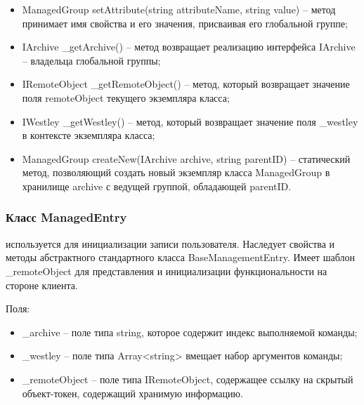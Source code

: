 \begin{itemize}
  \item ManagedGroup setAttribute(string attributeName, string value) – метод принимает имя свойства и его значения, присваивая его глобальной группе;
  \item IArchive \_getArchive() – метод возвращает реализацию интерфейса IArchive – владельца глобальной группы;
  \item IRemoteObject \_getRemoteObject() – метод, который возвращает значение поля remoteObject текущего экземпляра класса;
  \item IWestley \_getWestley() – метод, который возвращает значение поля \_westley в контексте экземпляра класса;
  \item ManagedGroup createNew(IArchive archive, string parentID) – статический метод, позволяющий создать новый экземпляр класса ManagedGroup в хранилище archive с ведущей группой, обладающей parentID.
\end{itemize}

\subsubsection{Класс ManagedEntry }
\label{sub:arch_and_mod:probab_net:managedentry}

используется для инициализации записи пользователя. Наследует свойства и методы абстрактного стандартного класса BaseManagementEntry. Имеет шаблон \_remoteObject для представления и инициализации функциональности на стороне клиента.

Поля:
\begin{itemize}
  \item \_archive – поле типа string, которое содержит индекс выполняемой команды;
  \item \_westley – поле типа Array<string> вмещает набор аргументов команды;
  \item \_remoteObject – поле типа IRemoteObject, содержащее ссылку на скрытый объект-токен, содержащий хранимую информацию.
\end{itemize}

